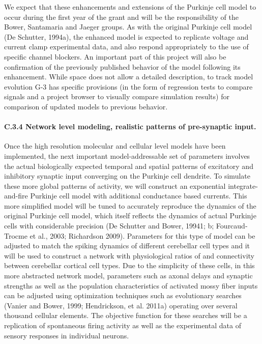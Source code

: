 \documentclass[12pt]{article}
\begin{document}
We expect that these enhancements and extensions of the
Purkinje cell model to occur during the first year of the grant
and will be the responsibility of the Bower, Santamaria and Jaeger
groups. As with the original Purkinje cell model (De Schutter,
1994a), the enhanced model is expected to replicate voltage and
current clamp experimental data, and also respond appropriately to the
use of specific channel blockers. An important part of this project
will also be confirmation of the previously published behavior of the model
following its enhancement. While space does not allow a detailed
description, to track model evolution G-3 has specific provisions (in the form of regression tests to compare
signals and a project browser to visually compare simulation
results) for comparison of updated models
to previous behavior.

\paragraph{C.3.4 Network level modeling, realistic patterns of pre-synaptic input.} Once the high resolution molecular and cellular level models have been implemented, the next important model-addressable set of parameters involves the actual biologically expected temporal and spatial patterns of excitatory and inhibitory synaptic input converging on the Purkinje cell dendrite. To simulate these more global patterns of activity, we will construct an exponential integrate-and-fire Purkinje cell model with additional conductance based currents. This more simplified model will be tuned to accurately reproduce the dynamics of the original Purkinje cell model, which itself reflects the dynamics of actual Purkinje cells with considerable precision (De Schutter and Bower, 19941; b; Fourcaud-Trocme et al., 2003; Richardson 2009). Parameters for this type of model can be adjusted to match the spiking dynamics of different cerebellar cell types and it will be used to construct a network with physiological ratios of and connectivity between cerebellar cortical cell types. Due to the simplicity of these cells, in this more abstracted network model, parameters such as axonal delays and synaptic strengths as well as the population characteristics of activated mossy fiber inputs can be adjusted using optimization techniques such as evolutionary searches (Vanier and Bower, 1999; Hendrickson, et al. 2011a) operating over several thousand cellular elements. The objective function for these searches will be a replication of spontaneous firing activity as well as the experimental data of sensory responses in individual neurons.
\end{document}
